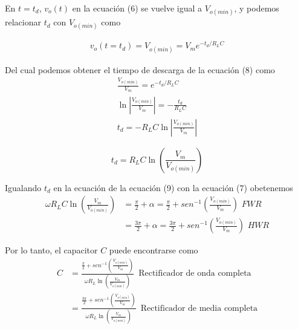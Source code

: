 \documentclass[12pt,a4paper]{article}
\begin{document}
	En $t=t_d$, $v_o(t)$ en la ecuación (6) se vuelve igual a $V_{o(min)}$, y podemos relacionar $t_d$ con $V_{o(min)}$ como
	
	\begin{align}
		v_o(t=t_d) = V_{o(min)} = V_m e^{-t_d/R_LC}
	\end{align}

	Del cual podemos obtener el tiempo de descarga de la ecuación (8) como
	\begin{align}
		\frac{V_{o(min)}}{V_m} = e^{-t_d/R_LC}\nonumber\\
		\ln \left| {\frac{V_{o(min)}}{V_m}} \right| = - \frac{t_d}{R_LC}\nonumber\\
		t_d = -R_LC \ln{\left| {\frac{V_{o(min)}}{V_m}} \right|} \nonumber
	\end{align} 

	\begin{tcolorbox}[colback=red!5!white,colframe=red!75!black,width=(\linewidth+0.45cm)]
		\begin{equation}
			t_d = R_LC \ln \left( \frac{V_m}{V_{o(min)}} \right)
		\end{equation}
	\end{tcolorbox}

	Igualando $t_d$ en la ecuación de la ecuación (9) con la ecuación (7) obetenemos
	\begin{subequations}
		\begin{align}
			\omega R_LC \ln \left( \frac{V_m}{V_{o(min)}} \right) &= \frac{\pi}{2} + \alpha = \frac{\pi}{2} + sen^{-1}\left( \frac{V_{o(min)}}{V_m} \right) \,\, FWR\\
			&= \frac{3\pi}{2} + \alpha = \frac{3\pi}{2} + sen^{-1}\left( \frac{V_{o(min)}}{V_m} \right)\,\, HWR
		\end{align}	
	\end{subequations}
	
	Por lo tanto, el capacitor $C$ puede encontrarse como
	\begin{subequations}
		\begin{align}
			C &= \frac{ \frac{\pi}{2} +  sen^{-1}\left( \frac{V_{o(min)}}{V_m} \right)  }{\omega R_L \ln \left( \frac{V_m}{V_{o(min)}} \right)} \,\,\, \text{Rectificador de onda completa}\\
			 &= \frac{ \frac{3\pi}{2} +  sen^{-1}\left( \frac{V_{o(min)}}{V_m} \right)  }{\omega R_L \ln \left( \frac{V_m}{V_{o(min)}} \right)} \,\,\, \text{Rectificador de media completa}
		\end{align}	
	\end{subequations}
\end{document}
